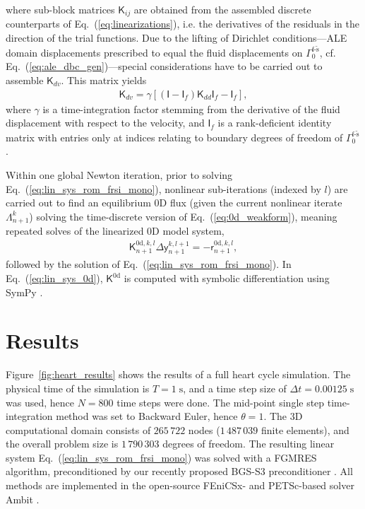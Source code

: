 where sub-block matrices $\boldsymbol{\mathsf{K}}_{ij}$ are obtained from the assembled discrete counterparts of Eq.~(\ref{eq:linearizations}), i.e. the derivatives of the residuals in the direction of the trial functions.
Due to the lifting of Dirichlet conditions---ALE domain displacements prescribed to equal the fluid displacements on $\mathit{\Gamma}_{0}^{\mathrm{f}\text{-}\tilde{\mathrm{s}}}$, cf. Eq.~(\ref{eq:ale_dbc_gen})---special considerations have to be carried out to assemble $\boldsymbol{\mathsf{K}}_{dv}$. 
This matrix yields
\begin{align}
    \boldsymbol{\mathsf{K}}_{dv} = \gamma\left[(\boldsymbol{\mathsf{I}} - \boldsymbol{\mathsf{I}}_{f}) \boldsymbol{\mathsf{K}}_{dd} \boldsymbol{\mathsf{I}}_{f} - \boldsymbol{\mathsf{I}}_{f}\right],
\end{align}
where $\gamma$ is a time-integration factor stemming from the derivative of the fluid displacement with respect to the velocity, and $\boldsymbol{\mathsf{I}}_{f}$ is a rank-deficient identity matrix with entries only at indices relating to boundary degrees of freedom of $\mathit{\Gamma}_{0}^{\mathrm{f}\text{-}\tilde{\mathrm{s}}}$.

Within one global Newton iteration, prior to solving Eq.~(\ref{eq:lin_sys_rom_frsi_mono}), nonlinear sub-iterations (indexed by $l$) are carried out to find an equilibrium 0D flux (given the current nonlinear iterate $\boldsymbol{\mathsf{\Lambda}}_{n+1}^{k}$) solving the time-discrete version of Eq.~(\ref{eq:0d_weakform}), meaning repeated solves of the linearized 0D model system, 
\begin{equation}
\begin{aligned}
\boldsymbol{\mathsf{K}}_{n+1}^{\mathrm{0d},k,l}\Delta\boldsymbol{\mathsf{y}}_{n+1}^{k,l+1}=-\boldsymbol{\mathsf{r}}_{n+1}^{\mathrm{0d},k,l},\label{eq:lin_sys_0d}
\end{aligned}    
\end{equation}
followed by the solution of Eq.~(\ref{eq:lin_sys_rom_frsi_mono}). In Eq.~(\ref{eq:lin_sys_0d}), $\boldsymbol{\mathsf{K}}^{\mathrm{0d}}$ is computed with symbolic differentiation using SymPy \cite{meurer2017-sympy}.

\section*{Results}

Figure~\ref{fig:heart_results} shows the results of a full heart cycle simulation. The physical time of the simulation is $T=1\;\mathrm{s}$, and a time step size of $\Delta t = 0.00125\;\mathrm{s}$ was used, hence $N=800$ time steps were done. The mid-point single step time-integration method was set to Backward Euler, hence $\theta=1$. The 3D computational domain consists of $265\,722$ nodes ($1\,487\,039$ finite elements), and the overall problem size is $1\,790\,303$ degrees of freedom. The resulting linear system Eq.~(\ref{eq:lin_sys_rom_frsi_mono}) was solved with a FGMRES \cite{saad1993} algorithm, preconditioned by our recently proposed BGS-S3 preconditioner \cite{hirschvogel2025-prec}. All methods are implemented in the open-source FEniCSx- \cite{baratta2023dolfinx} and PETSc-based \cite{balay2022-petsc} solver Ambit \cite{hirschvogel2024-ambit}.

